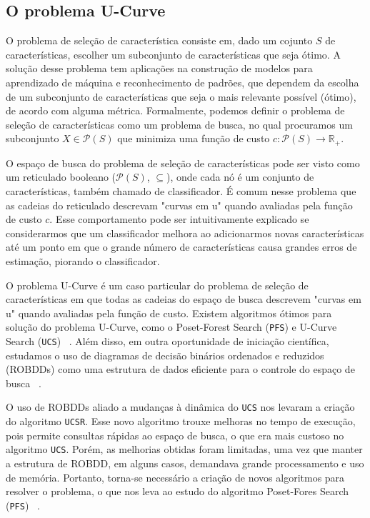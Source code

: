 \documentclass[12pt]{article}
\begin{document}
\subsection{O problema U-Curve}
O problema de seleção de característica consiste em, dado um cojunto $S$
de características, escolher um subconjunto de características que seja
ótimo. A solução desse problema tem aplicações na construção de modelos
para aprendizado de máquina e reconhecimento de padrões, que dependem da
escolha de um subconjunto de características que seja o mais relevante 
possível (ótimo), de acordo com alguma métrica. Formalmente, podemos 
definir o problema de seleção de características como um problema de 
busca, no qual procuramos um subconjunto $X \in \mathcal{P}(S)$ que 
minimiza uma função de custo $c : \mathcal{P}(S) \to \mathbb{R_+}$.

O espaço de busca do problema de seleção de características pode ser
visto como um reticulado booleano ($\mathcal{P}(S)$, $\subseteq$), onde
cada nó é um conjunto de características, também chamado de 
classificador. É comum nesse problema que as cadeias do reticulado
descrevam "curvas em u" quando avaliadas pela  função de custo $c$. Esse
comportamento pode ser intuitivamente explicado se considerarmos que um 
classificador melhora ao adicionarmos novas características até um ponto
em que o grande número de características causa grandes erros de 
estimação, piorando o classificador. 

O problema U-Curve é um caso particular do problema de seleção de
características em que todas as cadeias do espaço de busca descrevem
"curvas em u" quando avaliadas pela função de custo. Existem algoritmos
ótimos para solução do problema U-Curve, como o Poset-Forest Search
({\tt PFS}) e U-Curve Search ({\tt UCS}) ~\cite{msreis thesis}. Além 
disso, em outra oportunidade de iniciação científica, estudamos o uso
de diagramas de decisão binários ordenados e reduzidos (ROBDDs) como uma
estrutura de dados eficiente para o controle do espaço de busca 
~\cite{ucsrobdd ic}.

O uso de ROBDDs aliado a mudanças à dinâmica do {\tt UCS} nos levaram a 
criação do algoritmo {\tt UCSR}. Esse novo algoritmo trouxe melhoras no
tempo de execução, pois permite consultas rápidas ao espaço de busca, o
que era mais custoso no algoritmo {\tt UCS}. Porém, as melhorias obtidas
foram limitadas, uma vez que manter a estrutura de ROBDD, em alguns 
casos, demandava grande processamento e uso de memória. Portanto, 
torna-se necessário a criação de novos algoritmos para resolver o 
problema, o que nos leva ao estudo do algoritmo Poset-Fores Search 
({\tt PFS}) ~\cite{msreis thesis}.
\end{document}
